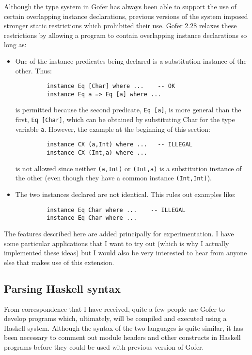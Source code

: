 Although the type system in Gofer has always been able to support the
use of certain overlapping instance declarations, previous versions of
the system imposed stronger static restrictions which prohibited their
use.  Gofer 2.28 relaxes these restrictions by allowing a program to
contain overlapping instance declarations so long as:
\begin{itemize}
\item  One of the instance predicates being declared is a substitution
     instance of the other.  Thus:
\begin{verbatim}
         instance Eq [Char] where ...    -- OK
         instance Eq a => Eq [a] where ...
\end{verbatim}
     is permitted because the second predicate, \verb"Eq [a]", is more general
     than the first, \verb"Eq [Char]", which can be obtained by substituting
     Char for the type variable \verb"a".  However, the example at the
     beginning of this section:
\begin{verbatim}
         instance CX (a,Int) where ...   -- ILLEGAL
         instance CX (Int,a) where ...
\end{verbatim}
     is not allowed since neither \verb"(a,Int)" or \verb"(Int,a)" is a substitution
     instance of the other (even though they have a common instance
     \verb"(Int,Int)").

\item  The two instances declared are not identical.  This rules out
     examples like:
\begin{verbatim}
         instance Eq Char where ...    -- ILLEGAL
         instance Eq Char where ...
\end{verbatim}
\end{itemize}
The features described here are added principally for experimentation.
I have some particular applications that I want to try out (which is
why I actually implemented these ideas) but I would also be very
interested to hear from anyone else that makes use of this extension.


\subsection{Parsing Haskell syntax}
From correspondence that I have received, quite a few people use Gofer
to develop programs which, ultimately, will be compiled and executed
using a Haskell system.  Although the syntax of the two languages is
quite similar, it has been necessary to comment out module headers and
other constructs in Haskell programs before they could be used with
previous version of Gofer.


